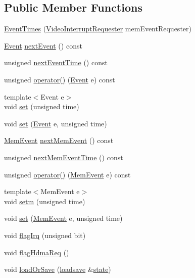 \subsection*{Public Member Functions}
\begin{DoxyCompactItemize}
\item 
\hyperlink{classgambatte_1_1LCD_1_1EventTimes_a1fa6d56defc84f65eb5d1a317091afc8}{Event\+Times} (\hyperlink{classgambatte_1_1VideoInterruptRequester}{Video\+Interrupt\+Requester} mem\+Event\+Requester)
\item 
\hyperlink{classgambatte_1_1LCD_a30ec19ea638b75c5c8972b2a1838b0c7}{Event} \hyperlink{classgambatte_1_1LCD_1_1EventTimes_a2822cb1d48ad650f8e5f433257991b85}{next\+Event} () const
\item 
unsigned \hyperlink{classgambatte_1_1LCD_1_1EventTimes_a0812df703759f4c4864e06fa6227a314}{next\+Event\+Time} () const
\item 
unsigned \hyperlink{classgambatte_1_1LCD_1_1EventTimes_a2e968a67987d0e7eb7afe188899e6699}{operator()} (\hyperlink{classgambatte_1_1LCD_a30ec19ea638b75c5c8972b2a1838b0c7}{Event} e) const
\item 
{\footnotesize template$<$Event e$>$ }\\void \hyperlink{classgambatte_1_1LCD_1_1EventTimes_a0bc5bcc9b1065d2603822e6db0a5eee8}{set} (unsigned time)
\item 
void \hyperlink{classgambatte_1_1LCD_1_1EventTimes_afa7238ae7fc6d48fdc710e4486dab4cd}{set} (\hyperlink{classgambatte_1_1LCD_a30ec19ea638b75c5c8972b2a1838b0c7}{Event} e, unsigned time)
\item 
\hyperlink{classgambatte_1_1LCD_a71147bde8c21c12e3cb7c70fcab81b76}{Mem\+Event} \hyperlink{classgambatte_1_1LCD_1_1EventTimes_a31230753beca7214709b10d6bf05aac1}{next\+Mem\+Event} () const
\item 
unsigned \hyperlink{classgambatte_1_1LCD_1_1EventTimes_aa9247fb79e7170125db355d380b4ec5d}{next\+Mem\+Event\+Time} () const
\item 
unsigned \hyperlink{classgambatte_1_1LCD_1_1EventTimes_acf5624c8f6b0971300d3e48b6580ec68}{operator()} (\hyperlink{classgambatte_1_1LCD_a71147bde8c21c12e3cb7c70fcab81b76}{Mem\+Event} e) const
\item 
{\footnotesize template$<$Mem\+Event e$>$ }\\void \hyperlink{classgambatte_1_1LCD_1_1EventTimes_a4f0607965b3cf9d9a4deb8ba19eb87de}{setm} (unsigned time)
\item 
void \hyperlink{classgambatte_1_1LCD_1_1EventTimes_ad11bf3927c4da8329f74cb605008d8ab}{set} (\hyperlink{classgambatte_1_1LCD_a71147bde8c21c12e3cb7c70fcab81b76}{Mem\+Event} e, unsigned time)
\item 
void \hyperlink{classgambatte_1_1LCD_1_1EventTimes_ad519fc1fbf6802530bb41956586e3551}{flag\+Irq} (unsigned bit)
\item 
void \hyperlink{classgambatte_1_1LCD_1_1EventTimes_a309beb0a36cdc41115c4c1322a6e174d}{flag\+Hdma\+Req} ()
\item 
void \hyperlink{classgambatte_1_1LCD_1_1EventTimes_a8393bd80f60b2a7d339c03bbbe06d53e}{load\+Or\+Save} (\hyperlink{classgambatte_1_1loadsave}{loadsave} \&\hyperlink{ppu_8cpp_a2f2eca6997ee7baf8901725ae074d45b}{state})
\end{DoxyCompactItemize}
